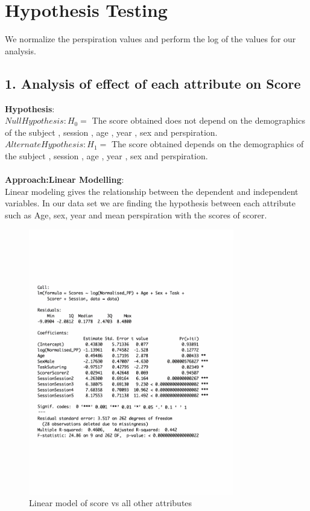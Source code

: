 \documentclass[12pt,epsf]{report}
\begin{document}
\newpage
\section*{Hypothesis Testing}
We normalize the perspiration values and perform the log of the values for our analysis.\\
\subsection*{1. Analysis of effect of each attribute on Score}
\textbf{Hypothesis}:\\
$Null Hypothesis : H_0 = $ The score obtained does not depend on the demographics of the subject , session , age , year , sex and perspiration.\\
$Alternate Hypothesis : H_1 = $ The score obtained  depends on the demographics of the subject , session , age , year , sex and perspiration.\\
\\
\textbf{Approach:Linear Modelling}:\\
Linear modeling gives the relationship between the dependent and independent variables. 
In our data set we are finding the hypothesis between each attribute such as Age, sex, year and mean perspiration with the scores of scorer.\\
\begin{figure}[!htb]
	\centering
	\includegraphics[width=0.8\textwidth]{ScoreSummary.pdf}
	\caption{Linear model of score vs all other attributes}
	\centering
\end{figure}
\end{document}
